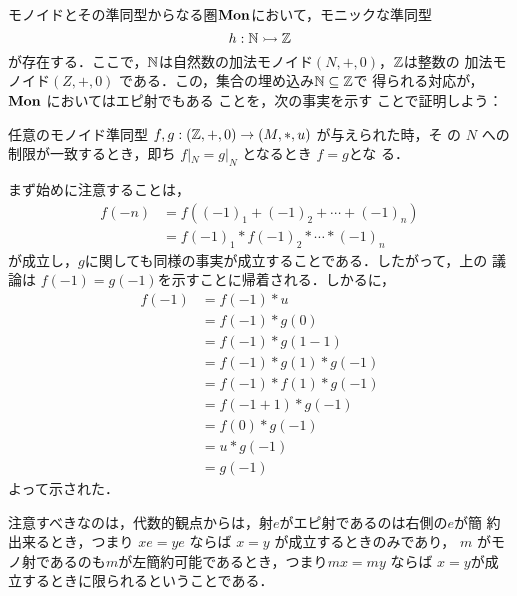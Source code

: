 \begin{example}\label{monoid and epis}
 モノイドとその準同型からなる圏$\mathbf{Mon}$において，モニックな準同型
 \[
  h: \mathbb{N} \rightarrowtail \mathbb{Z}
 \]
 が存在する．ここで，$\mathbb{N}$は自然数の加法モノイド$(N, +, 0)$，$\mathbb{Z}$は整数の
 加法モノイド$(Z, +, 0)$ である．この，集合の埋め込み$\mathbb{N} \subseteq \mathbb{Z}$で
 得られる対応が， $\mathbf{Mon}$ においてはエピ射でもある 
 ことを，次の事実を示す
 ことで証明しよう：

 任意のモノイド準同型 $f,g: (\mathbb{Z}, +, 0) \to (M, *, u)$ が与えられた時，そ
 の $N$ への制限が一致するとき，即ち $f|_N = g|_N$ となるとき $f=g$とな
 る．

 まず始めに注意することは，
 \begin{align*}
  f(-n) &= f((-1)_1 + (-1)_2 + \cdots + (-1)_n)\\
        &= f(-1)_1 * f(-1)_2 * \cdots * (-1)_n
 \end{align*}
 が成立し，$g$に関しても同様の事実が成立することである．したがって，上の
 議論は $f(-1) = g(-1)$を示すことに帰着される．しかるに，
 \begin{align*}
  f(-1) &= f(-1) * u\\
        &= f(-1) * g(0)\\
        &= f(-1) * g(1-1)\\
        &= f(-1) * g(1) * g(-1)\\
        &= f(-1) * f(1) * g(-1)\\
        &= f(-1 + 1) * g(-1) \\
        &= f(0) * g(-1)\\
        &= u * g(-1)\\
        &= g(-1)
 \end{align*}
 よって示された．
\end{example}

注意すべきなのは，代数的観点からは，射$e$がエピ射であるのは右側の$e$が簡
約出来るとき，つまり $xe = ye$ ならば $x = y$ が成立するときのみであり，
$m$ がモノ射であるのも$m$が左簡約可能であるとき，つまり$mx = my$ ならば
$x = y$が成立するときに限られるということである．

